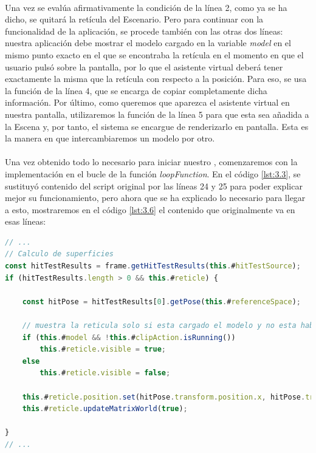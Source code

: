 \documentclass{subfiles}
\begin{document}
        \paragraph{}
        Una vez se evalúa afirmativamente la condición de la línea 2, como ya se ha dicho, se quitará la retícula del Escenario. Pero para continuar con la funcionalidad de la aplicación, se procede también con las otras dos líneas: nuestra aplicación debe mostrar el modelo cargado en la variable \textit{model} en el mismo punto exacto en el que se encontraba la retícula en el momento en que el usuario pulsó sobre la pantalla, por lo que el asistente virtual deberá tener exactamente la misma que la retícula con respecto a la posición. Para eso, se usa la función de la línea 4, que se encarga de copiar completamente dicha información. Por último, como queremos que aparezca el asistente virtual en nuestra pantalla, utilizaremos la función de la línea 5 para que esta sea añadida a la Escena y, por tanto, el sistema se encargue de renderizarlo en pantalla. Esta es la manera en que intercambiaremos un modelo por otro.
        
        \paragraph{}
        Una vez obtenido todo lo necesario para iniciar nuestro \hittestsource, comenzaremos con la implementación en el bucle de la función \textit{loopFunction}. En el código \ref{lst:3.3}, se sustituyó contenido del script original por las líneas 24 y 25 para poder explicar mejor su funcionamiento, pero ahora que se ha explicado lo necesario para llegar a esto, mostraremos en el código \ref{lst:3.6} el contenido que originalmente va en esas líneas:

\begin{lstlisting}[language=JavaScript, caption={Obtención de valores captados a través del Hit Test Source.}, label={lst:3.6}]
// ...
// Calculo de superficies
const hitTestResults = frame.getHitTestResults(this.#hitTestSource);
if (hitTestResults.length > 0 && this.#reticle) {

    const hitPose = hitTestResults[0].getPose(this.#referenceSpace);
    
    // muestra la reticula solo si esta cargado el modelo y no esta hablando
    if (this.#model && !this.#clipAction.isRunning())
        this.#reticle.visible = true;
    else
        this.#reticle.visible = false;
    
    this.#reticle.position.set(hitPose.transform.position.x, hitPose.transform.position.y, hitPose.transform.position.z)
    this.#reticle.updateMatrixWorld(true);
    
}
// ...
\end{lstlisting}
\end{document}
